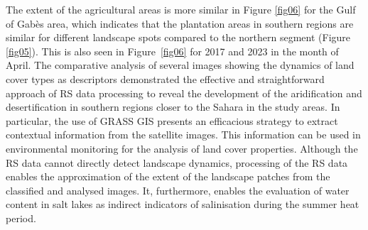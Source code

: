 \documentclass[land,article,accept,pdftex,moreauthors]{Definitions/mdpi}
\begin{document}
The {extent of the }agricultural areas {is }more similar in Figure \ref{fig06} for the Gulf of Gabès area, {which indicates} that the plantation areas in southern regions are{ }similar for different landscape spots compared to the northern segment (Figure \ref{fig05}). This is also seen in \mbox{Figure \ref{fig06}} for 2017 and 2023 in the month of April. The{ }comparative analysis of several images showing {the }dynamics of land cover types as descriptors {demonstrated the effective and straightforward approach of RS data processing }to reveal the development of {the }aridification and desertification in southern regions closer to the Sahara in the study areas. {In particular, the use of GRASS GIS presents an} efficacious strategy to extract contextual information {from the satellite images. This information can be used in environmental monitoring for the analysis of }land cover properties{. }{Although the} RS data cannot directly detect landscape dynamics{, }processing of {the }RS data enables the approximation of the extent of {the }landscape patches from {the }classified {and analysed }images{. It, furthermore, enables} the evaluation of water content in salt lakes as indirect indicators of salinisation during {the }summer heat {period}.
\end{document}
